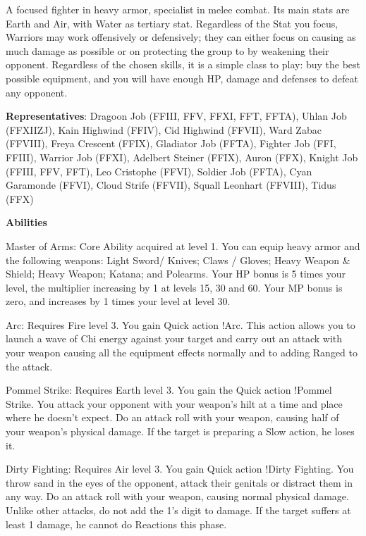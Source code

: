 \begin{jobdesc}[name=pjob-warrior]
  A focused fighter in heavy armor, specialist in melee combat. Its main stats are Earth and Air, with Water as tertiary stat. Regardless of the Stat you focus, Warriors may work offensively or defensively; they can either focus on causing as much damage as possible or on protecting the group to by weakening their opponent. Regardless of the chosen skills, it is a simple class to play: buy the best possible equipment, and you will have enough HP, damage and defenses to defeat any opponent.

  \textbf{Representatives}: Dragoon Job (FFIII, FFV, FFXI, FFT, FFTA), Uhlan Job (FFXIIZJ), Kain Highwind (FFIV), Cid Highwind (FFVII), Ward Zabac (FFVIII), Freya Crescent (FFIX), Gladiator Job (FFTA), Fighter Job (FFI, FFIII), Warrior Job (FFXI), Adelbert Steiner (FFIX), Auron (FFX), Knight Job (FFIII, FFV, FFT), Leo Cristophe (FFVI), Soldier Job (FFTA), Cyan Garamonde (FFVI), Cloud Strife (FFVII), Squall Leonhart (FFVIII), Tidus (FFX)



\end{jobdesc}

\begin{ffminipage}
  {\centering \textbf{Abilities} \par{}}

  Master of Arms: Core Ability acquired at level 1. You can equip heavy armor and the following weapons: Light Sword/ Knives; Claws / Gloves; Heavy Weapon \& Shield; Heavy Weapon; Katana; and Polearms. Your HP bonus is 5 times your level, the multiplier increasing by 1 at levels 15, 30 and 60. Your MP bonus is zero, and increases by 1 times your level at level 30.

  \begin{jobchoice}
    Arc: Requires Fire level 3. You gain Quick action !Arc. This action allows you to launch a wave of Chi energy against your target and carry out an attack with your weapon causing all the equipment effects normally and to adding Ranged to the attack.

    Pommel Strike: Requires Earth level 3. You gain the Quick action !Pommel Strike. You attack your opponent with your weapon’s hilt at a time and place where he doesn’t expect. Do an attack roll with your weapon, causing half of your weapon’s physical damage. If the target is preparing a Slow action, he loses it.

    Dirty Fighting: Requires Air level 3. You gain Quick action !Dirty Fighting. You throw sand in the eyes of the opponent, attack their genitals or distract them in any way. Do an attack roll with your weapon, causing normal physical damage. Unlike other attacks, do not add the 1’s digit to damage. If the target suffers at least 1 damage, he cannot do Reactions this phase.
  \end{jobchoice}
\end{ffminipage}


